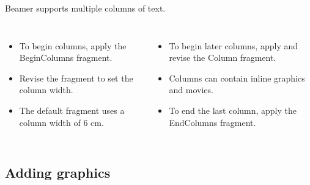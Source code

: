 \documentclass[notes=show,beamer]{beamer}
\makeatletter
\newenvironment{stepitemizewithalert}{\begin{itemize}[<+-| alert@+>]}{\end{itemize} }
\makeatother
\begin{document}
\begin{frame}%


Beamer supports multiple columns of text.

\begin{columns}[5cm]%
\column{5cm}%

\begin{stepitemizewithalert}
\item To begin columns, apply the BeginColumns fragment.

\item Revise the fragment to set the column width.

\item The default fragment uses a column width of 6 cm.
\end{stepitemizewithalert}

\column{5cm}%

\begin{stepitemizewithalert}
\item To begin later columns, apply and revise the Column fragment.

\item Columns can contain inline graphics and movies.

\item To end the last column, apply the EndColumns fragment.
\end{stepitemizewithalert}

\end{columns}%

\transboxout%
\end{frame}%

\subsection{Adding graphics}
\end{document}
